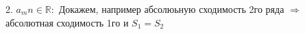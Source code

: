 \documentclass[12pt, oneside]{article}
\theoremstyle{plain}
\begin{document}
	2. \(a_mn \in \mathbb{R}: \)
	Докажем, например абсолюьную сходимость 2го ряда \(\Rightarrow\) абсолютная
	сходимость 1го и \(S_1 = S_2\)\\
\end{document}
